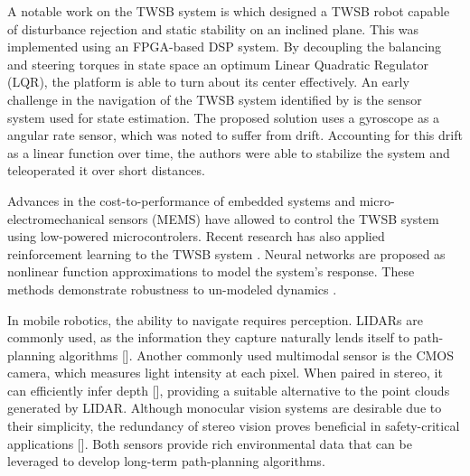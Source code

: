     A notable work on the TWSB system is \cite{grasser2002joe} which designed a TWSB robot capable of disturbance
    rejection and static stability on an inclined plane. This was implemented using an FPGA-based DSP system.
    By decoupling the balancing and steering torques in state space an optimum Linear Quadratic Regulator (LQR), the platform 
    is able to turn about its center effectively.
    An early challenge in the navigation of the TWSB system identified by \cite{SelfContainedMobileTWSB} is the sensor 
    system used for state estimation. The proposed solution uses a gyroscope as a angular rate sensor, which was noted to suffer
    from drift. Accounting for this drift as a linear function over time, the authors were able to stabilize the system and
    teleoperated it over short distances. 

    Advances in the cost-to-performance of embedded systems and micro-electromechanical sensors (MEMS) \cite{MEMS} 
    have allowed \cite{juang2013design} \cite{Velazquez2016VelocityAM} to control the TWSB system 
    using low-powered microcontrolers. 
    Recent research has also applied reinforcement learning to the TWSB system \cite{kober2013reinforcement}.
    Neural networks are proposed as nonlinear function approximations to model the system's response. 
    These methods demonstrate robustness to un-modeled dynamics \cite{guo2021optimal}.

    In mobile robotics, the ability to navigate requires perception. LIDARs are commonly used, as  
    the information they capture naturally lends itself to path-planning algorithms [].
    Another commonly used multimodal sensor is the CMOS camera, which measures light intensity at each pixel. 
    When paired in stereo, it can efficiently infer depth [], providing a suitable alternative to the point 
    clouds generated by LIDAR. Although monocular vision systems are desirable due to their simplicity, 
    the redundancy of stereo vision proves beneficial in safety-critical applications [].
    Both sensors provide rich environmental data that can be leveraged to develop long-term path-planning algorithms.
    
